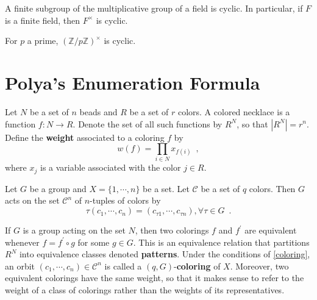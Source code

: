 \begin{proposition}
	\cite[314]{DummitFoote2004}
	A finite subgroup of the multiplicative group of a field is cyclic. In particular,
	if $F$ is a finite field, then $F^\times$ is cyclic.
\end{proposition}

\begin{corollary}
	\cite[314]{DummitFoote2004}
	For $p$ a prime, $(\mathbb{Z} / p \mathbb{Z})^\times$ is cyclic.
\end{corollary}

\chapter{Polya's Enumeration Formula}
\label{app:polya}

\begin{definition}
	\cite[85]{Aigner2007}
	Let $N$ be a set of $n$ beads and $R$ be a set of $r$ colors. A colored necklace is
	a function $f : N \to R$. Denote the set of all such functions by $R^N$, so that
	$|R^N| = r^n$. Define the \textbf{weight} associated to a coloring $f$ by
	\begin{equation}
		w(f) = \prod_{i \in N} x_{f(i)} \enspace,
	\end{equation}
	where $x_j$ is a variable associated with the color $j \in R$.
\end{definition}

\begin{proposition}
	\label{coloring}
	\cite[110]{Rotman1967}
	Let $G$ be a group and $X = \{ 1, \cdots, n \}$ be a set. Let $\mathcal{C}$ be a set
	of $q$ colors. Then $G$ acts on the set $\mathcal{C}^n$ of $n$-tuples of colors by
	\begin{equation}
		\tau(c_1, \cdots, c_n) = (c_{\tau 1}, \cdots, c_{\tau n}),
		\forall \tau \in G \enspace.
	\end{equation}
\end{proposition}

\begin{proposition}
	\cite[85]{Aigner2007}
	\cite[110]{Rotman1967}
	If $G$ is a group acting on the set $N$, then two colorings $f$ and $f^\prime$
	are equivalent whenever $f = f^\prime \circ g$ for some $g \in G$. This is an
	equivalence relation that partitions $R^N$ into equivalence classes denoted
	\textbf{patterns}. Under the conditions of \ref{coloring}, an orbit
	$(c_1, \cdots, c_n) \in \mathcal{C}^n$ is called a $(q, G)$-\textbf{coloring} of $X$.
	Moreover, two equivalent colorings have the same weight, so that it makes sense to refer to
	the weight of a class of colorings rather than the weights of its representatives.
\end{proposition}

